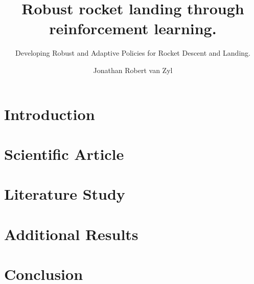 \documentclass{tudelft-report}
\begin{document}
\frontmatter

\title{Robust rocket landing through reinforcement learning.}
\subtitle{Developing Robust and Adaptive Policies for Rocket Descent and Landing.}
\author{Jonathan Robert van Zyl}

\subject{MSc Thesis, Faculty of Aerospace Engineering, Control and Operations} %

\makecover





\tableofcontents
\listoffigures
\listoftables




\mainmatter

\chapter{Introduction}
\label{chp:introduction}


\chapter{Scientific Article}
\label{chp:article}


\chapter{Literature Study}
\label{chp:literaturestudy}


\chapter{Additional Results}
\label{chp:additional_results}


\chapter{Conclusion}
\label{chp:conclusion}

\end{document}
